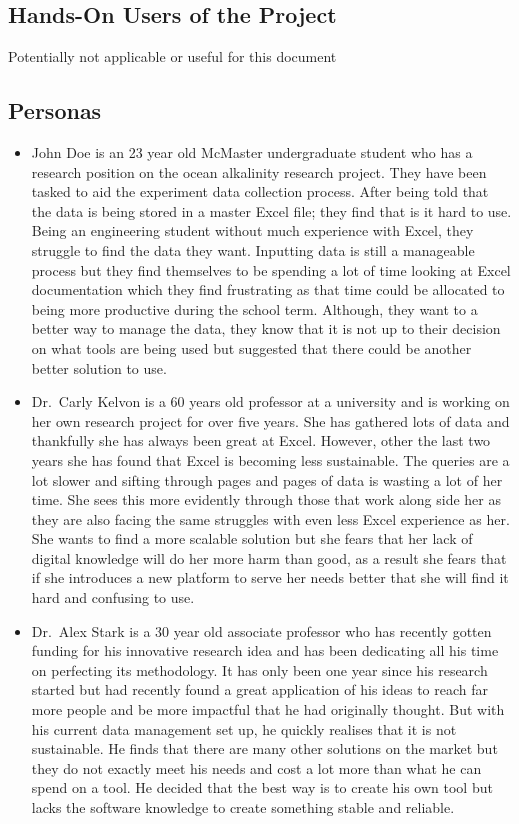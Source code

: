 \documentclass[12pt]{article}
\begin{document}
\subsection{Hands-On Users of the Project}
Potentially not applicable or useful for this document

\subsection{Personas}
\begin{itemize}
  \item John Doe is an 23 year old McMaster undergraduate student who has a
  research position on the ocean alkalinity research project. They have been
  tasked to aid the experiment data collection process. After being told that
  the data is being stored in a master Excel file; they find that is it hard to
  use. Being an engineering student without much experience with Excel, they
  struggle to find the data they want. Inputting data is still a manageable
  process but they find themselves to be spending a lot of time looking at Excel
  documentation which they find frustrating as that time could be allocated to
  being more productive during the school term. Although, they want to a better
  way to manage the data, they know that it is not up to their decision on what
  tools are being used but suggested that there could be another better solution
  to use. 
  \item Dr.\ Carly Kelvon is a 60 years old professor at a university and is
  working on her own research project for over five years. She has gathered lots
  of data and thankfully she has always been great at Excel. However, other the
  last two years she has found that Excel is becoming less sustainable. The
  queries are a lot slower and sifting through pages and pages of data is
  wasting a lot of her time. She sees this more evidently through those that
  work along side her as they are also facing the same struggles with even less
  Excel experience as her. She wants to find a more scalable solution but she
  fears that her lack of digital knowledge will do her more harm than good, as a
  result she fears that if she introduces a new platform to serve her needs
  better that she will find it hard and confusing to use. 
  \item Dr.\ Alex Stark is a 30 year old associate professor who has recently
  gotten funding for his innovative research idea and has been dedicating all
  his time on perfecting its methodology. It has only been one year since his
  research started but had recently found a great application of his ideas to
  reach far more people and be more impactful that he had originally thought.
  But with his current data management set up, he quickly realises that it is
  not sustainable. He finds that there are many other solutions on the market
  but they do not exactly meet his needs and cost a lot more than what he can
  spend on a tool. He decided that the best way is to create his own tool but
  lacks the software knowledge to create something stable and reliable. 
\end{itemize}
    
\end{document}
